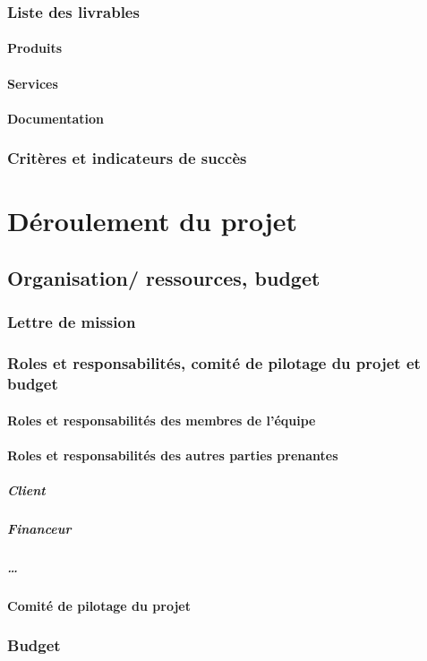 \subsubsection{Liste des livrables}
\paragraph{Produits}
\paragraph{Services}
\paragraph{Documentation}
\subsubsection{Critères et indicateurs de succès}


\section{Déroulement du projet}
\subsection{Organisation/ ressources, budget}
\subsubsection{Lettre de mission}
\subsubsection{Roles et responsabilités, comité de pilotage du projet et budget}
\paragraph{Roles et responsabilités des membres de l'équipe}
\paragraph{Roles et responsabilités des autres parties prenantes}
    \subparagraph{Client}
    \subparagraph{Financeur}
    \subparagraph{\dots}
\paragraph{Comité de pilotage du projet}

\subsubsection{Budget}

